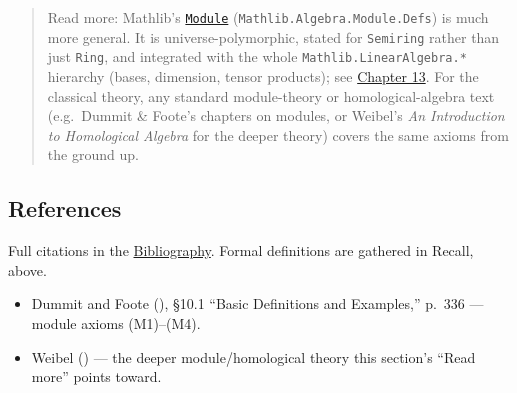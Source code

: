 \begin{quote}
Read more: Mathlib's \href{https://loogle.lean-lang.org/?q=Module}{\texttt{Module}} (\texttt{Mathlib.Algebra.Module.Defs}) is much more general. It is universe-polymorphic, stated for \texttt{Semiring} rather than just \texttt{Ring}, and integrated with the whole \texttt{Mathlib.LinearAlgebra.*} hierarchy (bases, dimension, tensor products); see \hyperref[sec:13-next-steps:02-moving-to-mathlib:1]{Chapter 13}. For the classical theory, any standard module-theory or homological-algebra text (e.g.~Dummit \& Foote's chapters on modules, or Weibel's \emph{An Introduction to Homological Algebra} for the deeper theory) covers the same axioms from the ground up.
\end{quote}

\subsection{References}\label{sec:10-modules:02-translating-into-lean:3}

Full citations in the \hyperref[sec:root:bibliography:1]{Bibliography}. Formal definitions are gathered in Recall, above.

\begin{itemize}
\tightlist
\item
  Dummit and Foote (\cite{DummitFoote2003}), §10.1 ``Basic Definitions and Examples,'' p.~336 --- module axioms (M1)--(M4).
\item
  Weibel (\cite{Weibel1994}) --- the deeper module/homological theory this section's ``Read more'' points toward.
\end{itemize}
